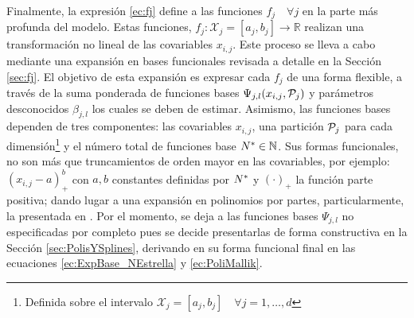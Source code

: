 \documentclass[../Main/Main.tex]{subfiles}
\begin{document}
Finalmente, la expresión \eqref{ec:fj} define a las funciones $f_j \quad \forall j$ en la parte más profunda del modelo. Estas funciones, $f_j: \mathcal{X}_j = [a_j,b_j] \rightarrow \mathbb{R}$ realizan una transformación no lineal de las covariables $x_{i,j}$. Este proceso se lleva a cabo mediante una expansión en bases funcionales revisada a detalle en la Sección \ref{sec:fj}. El objetivo de esta expansión es expresar cada $f_j$ de una forma flexible, a través de la suma ponderada de funciones bases $\Psi_{j,l}(x_{i,j},\P_j)$ y parámetros desconocidos $\beta_{j,l}$ los cuales se deben de estimar. Asimismo, las funciones bases dependen de tres componentes: las covariables $x_{i,j}$, una partición $\P_j$ para cada dimensión\footnote{Definida sobre el intervalo $\mathcal{X}_j = [a_j, b_j] \quad \forall j = 1,\ldots,d$} y el número total de funciones base $\N\in\mathbb{N}$. Sus formas funcionales, no son más que truncamientos de orden mayor en las covariables, por ejemplo: $(x_{i,j} - a)_+^b$ con $a,b$ constantes definidas por $\N$ y $(\cdot)_+$ la función parte positiva; dando lugar a una expansión en  
polinomios por partes, particularmente, la presentada en \citet{mallik1998automatic}. Por el momento, se deja a las funciones bases $\Psi_{j,l}$ no especificadas por completo pues se decide presentarlas de forma constructiva en la Sección \ref{sec:PolisYSplines}, derivando en su forma funcional final en las ecuaciones \eqref{ec:ExpBase_NEstrella} y \eqref{ec:PoliMallik}.
\end{document}
